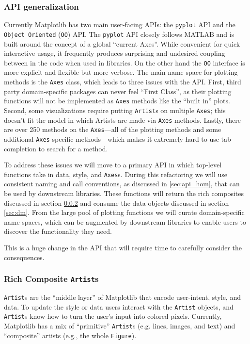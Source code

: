 \documentclass[11pt]{article}  %
\begin{document}
\subsubsection{API generalization}

Currently Matplotlib has two main user-facing APIs: the
\texttt{pyplot} API and the \texttt{Object Oriented} (\texttt{OO})
API.  The \texttt{pyplot} API closely follows MATLAB and is built
around the concept of a global ``current Axes''.  While convenient for
quick interactive usage, it frequently produces surprising and
undesired coupling between in the code when used in libraries.  On the
other hand the \texttt{OO} interface is more explicit and flexible but
more verbose.  The main name space for plotting methods is
the \texttt{Axes} class, which leads to three issues with the API.
First, third party domain-specific packages can never feel ``First
Class'', as their plotting functions will not be implemented as \texttt{Axes} methods like
the ``built in'' plots.  Second, some visualizations require putting
\texttt{Artist}s on multiple \texttt{Axes}; this doesn't fit the model
in which Artists are made via \texttt{Axes} methods.  Lastly, there are over 250
methods on the \texttt{Axes}---all of the plotting methods and some
additional \texttt{Axes} specific methods---which makes it extremely
hard to use tab-completion to search for a method.

To address these issues we will move to a primary API in which top-level
functions take
in data, style, and \texttt{Axes}s.  During this
refactoring we will use consistent naming and call conventions, as
discussed in \ref{sec:api_hom}, that can be used by downstream
libraries.  These functions will return the rich composites discussed
in section \ref{sec:artists} and consume the data objects discussed in
section \ref{sec:dm}.  From the large pool of plotting functions we
will curate domain-specific name spaces, which can be augmented by
downstream libraries to enable users to discover the functionality
they need.

This is a huge change in the API that will require time to carefully
consider the consequences.



\subsubsection{Rich Composite \texttt{Artist}s}
\label{sec:artists}
\texttt{Artist}s are the ``middle layer'' of Matplotlib that encode
user-intent, style, and data.
To update the style or data users interact with the \texttt{Artist}
objects, and \texttt{Artist}s know how to turn the user's input into
colored pixels.
Currently, Matplotlib has a mix of ``primitive'' \texttt{Artist}s
(e.g. lines, images, and text) and ``composite'' artists (e.g.,
the whole \texttt{Figure}).
\end{document}
